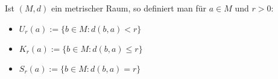 Ist $(M, d)$ ein metrischer Raum, so definiert man für $a \in M$ und $r > 0$:
\begin{itemize}[label={},leftmargin=0pt]
    \item {} $U_r(a) := \{ b \in M: d(b, a) < r \}$
    \item {} $K_r(a) := \{ b \in M: d(b, a) \leq r \}$
    \item {} $S_r(a) := \{ b \in M: d(b, a) = r \}$
\end{itemize}